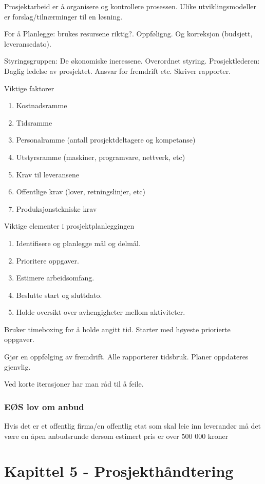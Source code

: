 \documentclass[11pt]{article}
\begin{document}
   Prosjektarbeid er å organisere og kontrollere prosessen. Ulike utviklingsmodeller er forslag/tilnærminger til en løsning.
   
   For å Planlegge: brukes resursene riktig?. Oppføligng. Og korreksjon (budsjett, leveransedato).

   Styringsgruppen: De økonomiske ineressene. Overordnet styring.
   Prosjektlederen: Daglig ledelse av prosjektet. Ansvar for fremdrift etc. Skriver rapporter.

   Viktige faktorer
\begin{enumerate}
\item Kostnadsramme
\item Tidsramme
\item Personalramme (antall prosjektdeltagere og kompetanse)
\item Utstyrsramme (maskiner, programvare, nettverk, etc)
\item Krav til leveransene
\item Offentlige krav (lover, retningslinjer, etc)
\item Produksjonstekniske krav
\end{enumerate}

   Viktige elementer i prosjektplanleggingen
\begin{enumerate}
\item Identifisere og planlegge mål og delmål.
\item Prioritere oppgaver.
\item Estimere arbeidsomfang.
\item Beslutte start og sluttdato.
\item Holde oversikt over avhengigheter mellom aktiviteter.
\end{enumerate}

   Bruker timeboxing for å holde angitt tid. Starter med høyeste priorierte oppgaver.

   Gjør en oppfølging av fremdrift. Alle rapporterer tidsbruk. Planer oppdateres gjenvlig.

   Ved korte iterasjoner har man råd til å feile.
\subsubsection{EØS lov om anbud}
\label{sec-4.2.1}

    Hvis det er et offentlig firma/en offentlig etat som skal leie inn leverandør
    må det være en åpen anbudsrunde dersom estimert pris er over 500 000 kroner
\section{Kapittel 5 - Prosjekthåndtering}
\label{sec-5}
\end{document}
